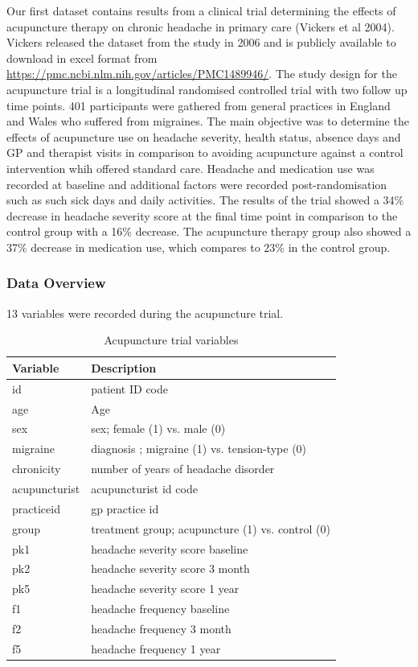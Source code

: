 \documentclass{article}
\begin{document}
Our first dataset contains results from a clinical trial determining the
effects of acupuncture therapy on chronic headache in primary care
(Vickers et al 2004). Vickers released the dataset from the study in
2006 and is publicly available to download in excel format from
\url{https://pmc.ncbi.nlm.nih.gov/articles/PMC1489946/}. The study
design for the acupuncture trial is a longitudinal randomised controlled
trial with two follow up time points. 401 participants were gathered
from general practices in England and Wales who suffered from migraines.
The main objective was to determine the effects of acupuncture use on
headache severity, health status, absence days and GP and therapist
visits in comparison to avoiding acupuncture against a control
intervention whih offered standard care. Headache and medication use was
recorded at baseline and additional factors were recorded
post-randomisation such as such sick days and daily activities. The
results of the trial showed a 34\% decrease in headache severity score
at the final time point in comparison to the control group with a 16\%
decrease. The acupuncture therapy group also showed a 37\% decrease in
medication use, which compares to 23\% in the control group.

\subsubsection{Data Overview}\label{data-overview}

13 variables were recorded during the acupuncture trial.

\begin{table}[H]
\centering
\caption{Acupuncture trial variables}
\label{}

\begin{tabular}{ll}
\toprule
Variable & Description\\
\midrule
id & patient ID code\\
age & Age\\
sex & sex; female (1) vs. male (0)\\
migraine & diagnosis ; migraine (1) vs. tension-type (0)\\
chronicity & number of years of headache disorder\\
\addlinespace
acupuncturist & acupuncturist id code\\
practiceid & gp practice id\\
group & treatment group; acupuncture (1) vs. control (0)\\
pk1 & headache severity score baseline\\
pk2 & headache severity score 3 month\\
\addlinespace
pk5 & headache severity score 1 year\\
f1 & headache frequency baseline\\
f2 & headache frequency 3 month\\
f5 & headache frequency 1 year\\
\bottomrule
\end{tabular}
\end{table}
\end{document}
